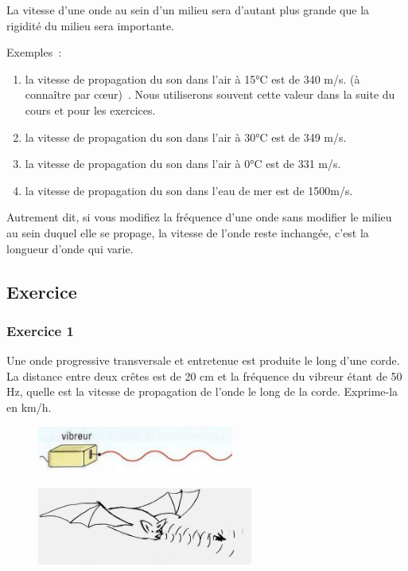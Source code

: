 \begin{multicols}{2}
La vitesse d'une onde au sein d'un milieu sera d'autant plus
grande que la rigidité du milieu sera importante.

Exemples~: 
\begin{enumerate}
\item  la vitesse de propagation du son dans l'air à 15°C est de 340 m/s. (à connaître par cœur)~. Nous utiliserons souvent cette valeur dans la suite du cours et
  pour les exercices.
\item  la vitesse de propagation du son dans l'air à 30°C est de 349 m/s.
\item  la vitesse de propagation du son dans l'air à 0°C est de 331 m/s.
\item  la vitesse de propagation du son dans l'eau de mer est de 1500m/s.
\end{enumerate}

Autrement dit, si vous modifiez la fréquence d'une onde sans modifier le
milieu au sein duquel elle se propage, la vitesse de l'onde reste
inchangée, c'est la longueur d'onde qui varie.

\subsection{Exercice}

\subsubsection*{Exercice 1}
  Une onde progressive transversale et entretenue est produite le long
  d'une corde. La distance entre deux crêtes est de 20 cm et la
  fréquence du vibreur étant de 50 Hz, quelle est la vitesse de
  propagation de l'onde le long de la corde. Exprime-la en km/h.
\begin{figure}
\centering
\includegraphics[width=6.468cm,height=1.552cm]{Pictures/10000001000001F900000079C23D6065BA9505A8.png}
\caption{}
\end{figure}

\begin{figure}
\centering
\includegraphics[width=7.103cm,height=2.54cm]{Pictures/10000001000001320000006DEEEFAD8D2B8AA8D8.png}
\caption{}
\end{figure}


\end{multicols}
